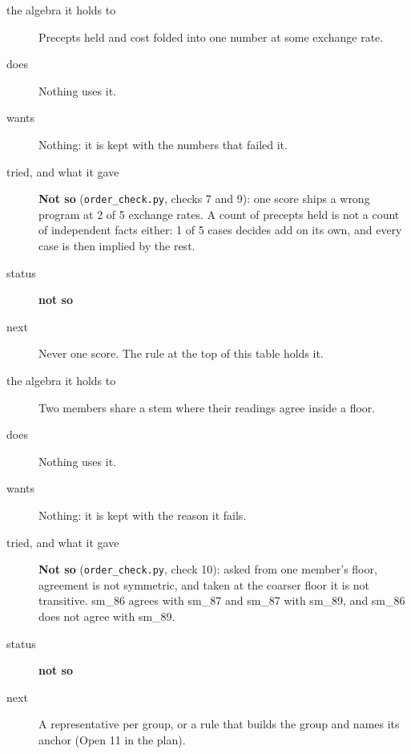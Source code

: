 \begin{description}
\item[{the algebra it holds to}] Precepts held and cost folded into one number at some exchange rate.
\item[{does}] Nothing uses it.
\item[{wants}] Nothing: it is kept with the numbers that failed it.
\item[{tried, and what it gave}] \textbf{Not so} (\texttt{order\_\allowbreak{}check.\allowbreak{}py}, checks 7 and 9): one score ships a wrong program at 2 of 5 exchange rates. A count of precepts held is not a count of independent facts either: 1 of 5 cases decides add on its own, and every case is then implied by the rest.
\item[{status}] \textbf{not so}
\item[{next}] Never one score. The rule at the top of this table holds it.
\end{description}

\begin{description}
\item[{the algebra it holds to}] Two members share a stem where their readings agree inside a floor.
\item[{does}] Nothing uses it.
\item[{wants}] Nothing: it is kept with the reason it fails.
\item[{tried, and what it gave}] \textbf{Not so} (\texttt{order\_\allowbreak{}check.\allowbreak{}py}, check 10): asked from one member's floor, agreement is not symmetric, and taken at the coarser floor it is not transitive. sm\_\allowbreak{}86 agrees with sm\_\allowbreak{}87 and sm\_\allowbreak{}87 with sm\_\allowbreak{}89, and sm\_\allowbreak{}86 does not agree with sm\_\allowbreak{}89.
\item[{status}] \textbf{not so}
\item[{next}] A representative per group, or a rule that builds the group and names its anchor (Open 11 in the plan).
\end{description}

